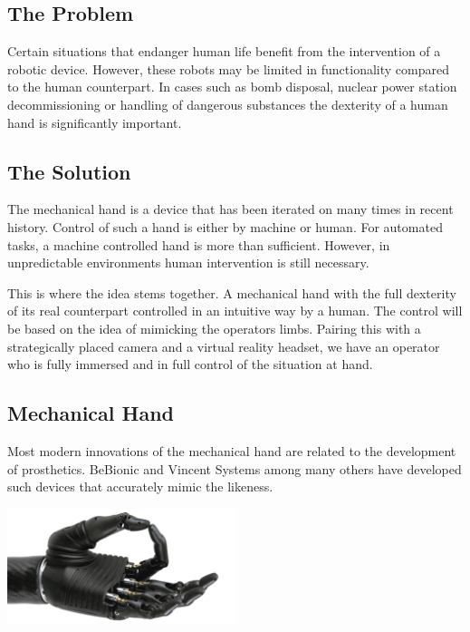 \documentclass{article}
\begin{document}
\subsection{The Problem}
Certain situations that endanger human life benefit from the intervention of a robotic device. However, these robots may be limited in functionality compared to the human counterpart. In cases such as bomb disposal, nuclear power station decommissioning or handling of dangerous substances the dexterity of a human hand is significantly important.

\subsection{The Solution}
The mechanical hand is a device that has been iterated on many times in recent history. Control of such a hand is either by machine or human. For automated tasks, a machine controlled hand is more than sufficient. However, in unpredictable environments human intervention is still necessary.

This is where the idea stems together. A mechanical hand with the full dexterity of its real counterpart controlled in an intuitive way by a human. The control will be based on the idea of mimicking the operators limbs. Pairing this with a strategically placed camera and a virtual reality headset, we have an operator who is fully immersed and in full control of the situation at hand.

\subsection{Mechanical Hand}
Most modern innovations of the mechanical hand are related to the development of prosthetics. BeBionic \cite{bebionic} and Vincent Systems \cite{vincent} among many others have developed such devices that accurately mimic the likeness.

\begin{center}
\includegraphics[width=0.5\textwidth]{IMG/Bebionic_V2_Hand.png}
\end{center}
\end{document}
